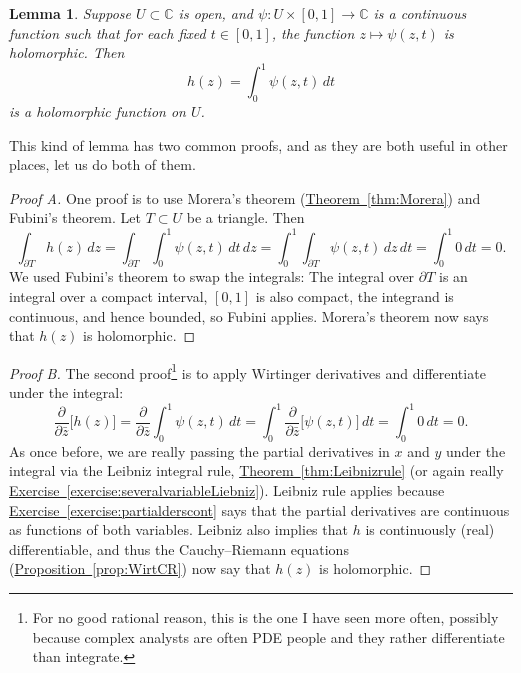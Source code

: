 \documentclass[12pt,openany]{book}
\newcommand{\C}{{\mathbb{C}}}
\theoremstyle{plain}
\newtheorem{lemma}[thm]{Lemma}
\theoremstyle{remark}
\theoremstyle{definition}
\theoremstyle{exercise}
\theoremstyle{example}
\newcommand{\exerciseref}[1]{\hyperref[#1]{Exercise~\ref*{#1}}}
\newcommand{\thmref}[1]{\hyperref[#1]{Theorem~\ref*{#1}}}
\newcommand{\propref}[1]{\hyperref[#1]{Proposition~\ref*{#1}}}
\begin{document}
\begin{lemma} \label{lemma:holfuncbyintegral}
Suppose $U \subset \C$ is open, and
$\psi \colon U \times [0,1] \to \C$ is a continuous function such that
for each fixed $t \in [0,1]$, the function $z \mapsto \psi(z,t)$ is
holomorphic.  Then
\begin{equation*}
h(z) =
\int_0^1 \psi(z,t) \, dt
\end{equation*}
is a holomorphic function on $U$.
\end{lemma}

This kind of lemma has two common proofs,
and as they are both useful in other places, let us do both of them.

\begin{proof}[Proof A]
One proof is to use Morera's theorem (\thmref{thm:Morera}) and Fubini's theorem.
Let $T \subset U$ be a triangle.  Then
\begin{equation*}
\int_{\partial T}
h(z)
\, dz
=
\int_{\partial T}
\int_0^1 \psi(z,t) \, dt
\, dz
=
\int_0^1
\int_{\partial T}
\psi(z,t)
\, dz
\, dt
= \int_0^1 0 \, dt = 0.
\end{equation*}
We used Fubini's theorem to swap the integrals:
The integral over $\partial T$ is an integral over a compact interval,
$[0,1]$ is also compact,
the integrand is continuous, and hence bounded, so Fubini applies.
Morera's theorem now says that $h(z)$ is
holomorphic.
\end{proof}

\begin{proof}[Proof B]
The second proof\footnote{%
For no good rational reason, this is the one I have seen more often,
possibly because complex analysts are often PDE
people and they rather differentiate than integrate.}
is to apply Wirtinger derivatives and differentiate under the integral:
\begin{equation*}
\frac{\partial}{\partial \bar{z}}
\bigl[
h(z)
\bigr]
=
\frac{\partial}{\partial \bar{z}}
\int_0^1 \psi(z,t) \, dt
=
\int_0^1
\frac{\partial}{\partial \bar{z}}
\bigl[
\psi(z,t)
\bigr]
\, dt
= \int_0^1 0 \, dt = 0.
\end{equation*}
As once before, we are really passing the partial derivatives in $x$
and $y$ under the integral via the Leibniz integral rule,
\thmref{thm:Leibnizrule} (or again really
\exerciseref{exercise:severalvariableLiebniz}).
Leibniz rule applies because 
\exerciseref{exercise:partialderscont} says that the partial
derivatives are continuous as functions of both variables.
Leibniz also implies that $h$ is continuously (real) differentiable,
and thus
the Cauchy--Riemann equations
(\propref{prop:WirtCR}) now
say that $h(z)$ is holomorphic.
\end{proof}
\end{document}
